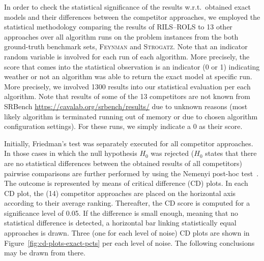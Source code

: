 \documentclass{bmcart}
\begin{document}
In order to check the statistical significance of the results w.r.t.\ obtained exact models and their differences between the competitor approaches, we employed the statistical methodology comparing the results of \textsc{RILS}--\textsc{ROLS} to 13 other approaches over all algorithm runs on the problem instances from the both ground-truth benchmark sets, \textsc{Feynman} and \textsc{Strogatz}. Note that an indicator random variable is involved for each run of each algorithm. More precisely, the score that comes into the statistical observation is an indicator (0 or 1) indicating weather or not an algorithm was able to return the exact model at specific run. More precisely, we involved 1300 results into our statistical evaluation per each algorithm. Note that  results of some of the 13 competitors are not known from SRBench \url{https://cavalab.org/srbench/results/} due to   unknown reasons (most likely algorithm is terminated running out of memory or due to   chosen algorithm configuration settings). For these runs, we simply indicate a 0 as their score.   

Initially, Friedman’s test was separately executed for all competitor approaches.      In those cases in which the null hypothesis $H_0$ was rejected ($H_0$ states that there are no statistical differences between the obtained results of all competitors) pairwise comparisons are further performed by using the Nemenyi post-hoc test~\cite{pohlert2014pairwise}. The outcome is represented by means of critical difference (CD) plots. In each CD plot, the (14) competitor approaches are placed on the horizontal axis according to their average ranking. Thereafter, the CD score is computed for a significance level of 0.05. If the difference is small enough, meaning that no statistical difference is detected, a horizontal bar linking statistically equal approaches is drawn.   Three (one for each level of noise) CD plots are shown in Figure~\ref{fig:cd-plots-exact-pcts} per each level of noise. The following conclusions may be drawn from there.
\end{document}
